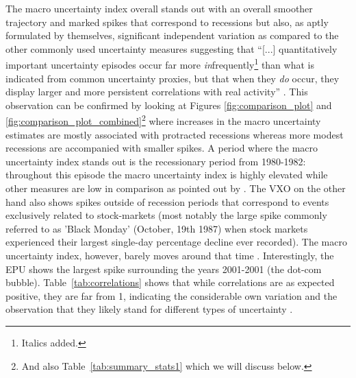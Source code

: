 \documentclass[a4paper,11pt,listof=nochaptergap,oneside,pointednumbers,bibtotoc,bigheadings,liststotoc,hidelinks]{scrbook}
\theoremstyle{mysatz}
\theoremstyle{mydefinition}
\theoremstyle{mytheorem}
\theoremstyle{mybemerkung}
\begin{document}
The macro uncertainty index overall stands out with an overall smoother trajectory and marked spikes that correspond to recessions but also, as aptly formulated by \citet{juradoetal:15} themselves, significant independent variation as compared to the other commonly used uncertainty measures suggesting that ``[...] quantitatively important uncertainty episodes occur far more \textit{in}frequently\footnote{Italics added.} than what is indicated from common uncertainty proxies, but that when they \textit{do} occur, they display larger and more persistent correlations with real activity'' \citep[p. 1181]{juradoetal:15}. This observation can be confirmed by looking at Figures \ref{fig:comparison_plot} and \ref{fig:comparison_plot_combined}\footnote{And also Table~\ref{tab:summary_stats1} which we will discuss below.} where increases in the macro uncertainty estimates are mostly associated with protracted recessions whereas more modest recessions are accompanied with smaller spikes. A period where the macro uncertainty index stands out is the recessionary period from 1980-1982: throughout this episode the macro uncertainty index is highly elevated while other measures are low in comparison as pointed out by \citet{juradoetal:15}. The VXO on the other hand also shows spikes outside of recession periods that correspond to events exclusively related to stock-markets (most notably the large spike commonly referred to as 'Black Monday' (October, 19th 1987) when stock markets experienced their largest single-day percentage decline ever recorded). The macro uncertainty index, however, barely moves around that time \citep{juradoetal:15}. Interestingly, the EPU shows the largest spike surrounding the years 2001-2001 (the dot-com bubble). Table~\ref{tab:correlations} shows that while correlations are as expected positive, they are far from 1, indicating the considerable own variation and the observation that they likely stand for different types of uncertainty \citep{bachmannetal:13}.

\begin{table}[t]
\centering
\caption[Correlation matrix of uncertainty measures.]{Correlation matrix of the uncertainty measures from Figure~\ref{fig:comparison_plot}. \\ \textit{Note:} Correlations are calculated for the period where all three uncertainty measures overlap, i.e. 07:1962 - 10:2014}
\label{tab:correlations}
\end{table}
\end{document}
